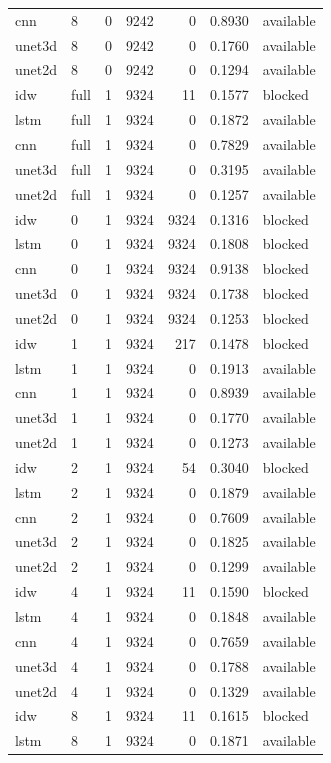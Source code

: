\begin{tabular}{llrrrrl}
cnn & 8 & 0 & 9242 & 0 & 0.8930 & available \\
unet3d & 8 & 0 & 9242 & 0 & 0.1760 & available \\
unet2d & 8 & 0 & 9242 & 0 & 0.1294 & available \\
idw & full & 1 & 9324 & 11 & 0.1577 & blocked \\
lstm & full & 1 & 9324 & 0 & 0.1872 & available \\
cnn & full & 1 & 9324 & 0 & 0.7829 & available \\
unet3d & full & 1 & 9324 & 0 & 0.3195 & available \\
unet2d & full & 1 & 9324 & 0 & 0.1257 & available \\
idw & 0 & 1 & 9324 & 9324 & 0.1316 & blocked \\
lstm & 0 & 1 & 9324 & 9324 & 0.1808 & blocked \\
cnn & 0 & 1 & 9324 & 9324 & 0.9138 & blocked \\
unet3d & 0 & 1 & 9324 & 9324 & 0.1738 & blocked \\
unet2d & 0 & 1 & 9324 & 9324 & 0.1253 & blocked \\
idw & 1 & 1 & 9324 & 217 & 0.1478 & blocked \\
lstm & 1 & 1 & 9324 & 0 & 0.1913 & available \\
cnn & 1 & 1 & 9324 & 0 & 0.8939 & available \\
unet3d & 1 & 1 & 9324 & 0 & 0.1770 & available \\
unet2d & 1 & 1 & 9324 & 0 & 0.1273 & available \\
idw & 2 & 1 & 9324 & 54 & 0.3040 & blocked \\
lstm & 2 & 1 & 9324 & 0 & 0.1879 & available \\
cnn & 2 & 1 & 9324 & 0 & 0.7609 & available \\
unet3d & 2 & 1 & 9324 & 0 & 0.1825 & available \\
unet2d & 2 & 1 & 9324 & 0 & 0.1299 & available \\
idw & 4 & 1 & 9324 & 11 & 0.1590 & blocked \\
lstm & 4 & 1 & 9324 & 0 & 0.1848 & available \\
cnn & 4 & 1 & 9324 & 0 & 0.7659 & available \\
unet3d & 4 & 1 & 9324 & 0 & 0.1788 & available \\
unet2d & 4 & 1 & 9324 & 0 & 0.1329 & available \\
idw & 8 & 1 & 9324 & 11 & 0.1615 & blocked \\
lstm & 8 & 1 & 9324 & 0 & 0.1871 & available \\

\end{tabular}
